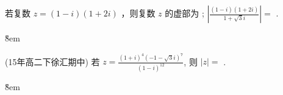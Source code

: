 \begin{example}
    若复数 $z=(1-i)(1+2 i)$ ，则复数 $z$ 的虚部为 \underline{\qquad}; $\left|\frac{(1-i)(1+2 i)}{1+\sqrt{3} i}\right|=$ \underline{\qquad}.
\end{example}

\v{8em}

\begin{example}
    (15年高二下徐汇期中)
    若 $z=\frac{(1+i)^4(-1-\sqrt{3} i)^7}{(1-i)^{12}}$, 则 $|z|=$ \underline{\qquad}.
\end{example}

\v{8em}
